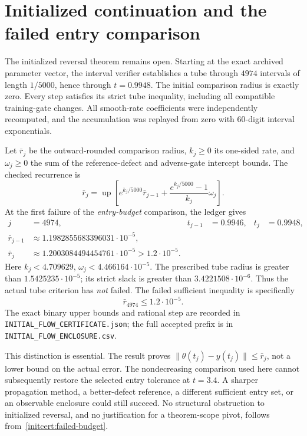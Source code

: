 \documentclass[10pt]{article}
\begin{document}
\section{Initialized continuation and the failed entry comparison}
The initialized reversal theorem remains open. Starting at the exact
archived parameter vector, the interval verifier establishes a tube through
$4974$ intervals of length $1/5000$, hence through $t=0.9948$.
The initial comparison radius is exactly zero. Every step satisfies its
strict tube inequality, including all compatible training-gate changes.
All smooth-rate coefficients were independently recomputed, and the
accumulation was replayed from zero with $60$-digit interval exponentials.

Let $\bar r_j$ be the outward-rounded comparison radius, $k_j\ge0$ its
one-sided rate, and $\omega_j\ge0$ the sum of the reference-defect and
adverse-gate intercept bounds. The checked recurrence is
\[
 \bar r_j=\operatorname{up}\left[
 e^{k_j/5000}\bar r_{j-1}
 +\frac{e^{k_j/5000}-1}{k_j}\omega_j\right].
\]
At the first failure of the \emph{entry-budget} comparison, the ledger gives
\begin{align*}
 j&=4974, &t_{j-1}&=0.9946,&t_j&=0.9948,\\
 \bar r_{j-1}&\approx1.1982855683396031\cdot10^{-5},&&&\\
 \bar r_j&\approx1.2003084494454761\cdot10^{-5}
                  >1.2\cdot10^{-5}.&&&
\end{align*}
Here $k_j<4.709629$, $\omega_j<4.466164\cdot10^{-5}$.
The prescribed tube radius is greater than $1.5425235\cdot10^{-5}$;
its strict slack is greater than $3.4221508\cdot10^{-6}$.
Thus the actual tube criterion has \emph{not} failed. The failed sufficient
inequality is specifically
\begin{equation}\label{initcert:failed-budget}
 \boxed{\bar r_{4974}\le1.2\cdot10^{-5}.}
\end{equation}
The exact binary upper bounds and rational step are recorded in
\texttt{INITIAL\_FLOW\_CERTIFICATE.json}; the full accepted prefix is in
\texttt{INITIAL\_FLOW\_ENCLOSURE.csv}.

This distinction is essential. The result proves
$\|\theta(t_j)-y(t_j)\|\le\bar r_j$, not a lower bound on the actual
error. The nondecreasing comparison used here cannot subsequently restore
the selected entry tolerance at $t=3.4$. A sharper propagation method,
a better-defect reference, a different sufficient entry set, or an
observable enclosure could still succeed. No structural obstruction to
initialized reversal, and no justification for a theorem-scope pivot,
follows from~\eqref{initcert:failed-budget}.
\end{document}

